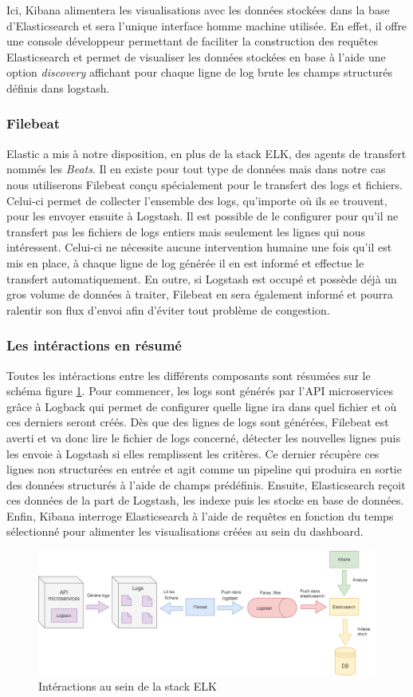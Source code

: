 	Ici, Kibana alimentera les visualisations avec les données stockées dans la base d'Elasticsearch et sera l'unique interface homme machine utilisée. En effet, il offre une console développeur permettant de faciliter la construction des requêtes Elasticsearch et permet de visualiser les données stockées en base à l'aide une option \textit{discovery} affichant pour chaque ligne de log brute les champs structurés définis dans logstash.
	
	\subsubsection{Filebeat}	
	Elastic a mis à notre disposition, en plus de la stack ELK, des agents de transfert nommés les \textit{Beats}. Il en existe pour tout type de données mais dans notre cas nous utiliserons Filebeat conçu spécialement pour le transfert des logs et fichiers. Celui-ci permet de collecter l'ensemble des logs, qu'importe où ils se trouvent, pour les envoyer ensuite à Logstash. Il est possible de le configurer pour qu'il ne transfert pas les fichiers de logs entiers mais seulement les lignes qui nous intéressent. Celui-ci ne nécessite aucune intervention humaine une fois qu'il est mis en place, à chaque ligne de log générée il en est informé et effectue le transfert automatiquement. En outre, si Logstash est occupé et possède déjà un gros volume de données à traiter, Filebeat en sera également informé et pourra ralentir son flux d'envoi afin d'éviter tout problème de congestion.

	\subsubsection{Les intéractions en résumé}
	Toutes les intéractions entre les différents composants sont résumées sur le schéma figure \ref{elk}. Pour commencer, les logs sont générés par l'API microservices grâce à Logback qui permet de configurer quelle ligne ira dans quel fichier et où ces derniers seront créés. Dès que des lignes de logs sont générées, Filebeat est averti et va donc lire le fichier de logs concerné, détecter les nouvelles lignes puis les envoie à Logstash si elles remplissent les critères. Ce dernier récupère ces lignes non structurées en entrée et agit comme un pipeline qui produira en sortie des données structurés à l'aide de champs prédéfinis. Ensuite, Elasticsearch reçoit ces données de la part de Logstash, les indexe puis les stocke en base de données. Enfin, Kibana interroge Elasticsearch à l'aide de requêtes en fonction du temps sélectionné pour alimenter les visualisations créées au sein du dashboard. 
	
\begin{figure}[h!]
	\includegraphics[scale=0.5]{images/travailNeuflizeOBC/dashboard/elk.png}
	\centering
	\caption{Intéractions au sein de la stack ELK}
	\label{elk}
\end{figure}